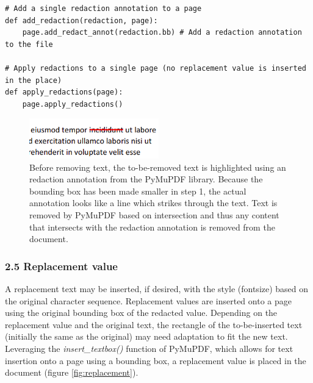 \begin{lstlisting}[style=CStyle, caption=Pseudocode for using the bounding boxes defined in the previous step where they are passed to the \textit{add\_redact\_annot()} PyMuPDF function and then applying them which removes any content from the selected area.]
# Add a single redaction annotation to a page
def add_redaction(redaction, page):
    page.add_redact_annot(redaction.bb) # Add a redaction annotation to the file

# Apply redactions to a single page (no replacement value is inserted in the place)
def apply_redactions(page):
    page.apply_redactions()

\end{lstlisting}

\begin{figure}[h]
\includegraphics[width=0.5\textwidth]{latex/media/redactannot.png}
\centering
\caption{Before removing text, the to-be-removed text is highlighted using an redaction annotation from the PyMuPDF library. Because the bounding box has been made smaller in step 1, the actual annotation looks like a line which strikes through the text. Text is removed by PyMuPDF based on intersection and thus any content that intersects with the redaction annotation is removed from the document.}
\label{fig:redactannot1}
\end{figure}
\subsubsection{2.5 Replacement value}
A replacement text may be inserted, if desired, with the style (fontsize) based on the original character sequence. Replacement values are inserted onto a page using the original bounding box of the redacted value. Depending on the replacement value and the original text, the rectangle of the to-be-inserted text (initially the same as the original) may need adaptation to fit the new text. Leveraging the \textit{insert\_textbox()} function of PyMuPDF, which allows for text insertion onto a page using a bounding box, a replacement value is placed in the document (figure \ref{fig:replacement}).

